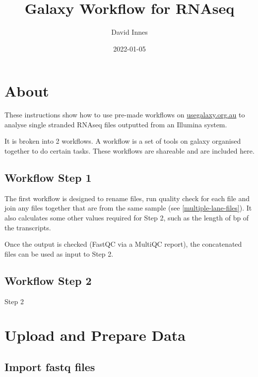 \documentclass[
]{book}
\title{Galaxy Workflow for RNAseq}
\author{David Innes}
\date{2022-01-05}
\begin{document}
\maketitle

{
\setcounter{tocdepth}{1}
\tableofcontents
}
\hypertarget{about}{%
\chapter{About}\label{about}}

These instructions show how to use pre-made workflows on \url{usegalaxy.org.au}
to analyse single stranded RNAseq files outputted from an Illumina system.

It is broken into 2 workflows. A workflow is a set of tools on galaxy organised together to do certain tasks. These workflows are shareable and are included here.

\hypertarget{workflow-step-1}{%
\section*{Workflow Step 1}\label{workflow-step-1}}

The first workflow is designed to rename files, run quality check for each file and join any files together that are from the same sample (see \ref{multiple-lane-files}). It also calculates some other values required for Step 2, such as the length of bp of the transcripts.

Once the output is checked (FastQC via a MultiQC report), the concatenated files can be used as input to Step 2.

\hypertarget{workflow-step-2}{%
\section*{Workflow Step 2}\label{workflow-step-2}}

Step 2

\hypertarget{upload-and-prepare-data}{%
\chapter{Upload and Prepare Data}\label{upload-and-prepare-data}}

\hypertarget{import-fastq-files}{%
\section{Import fastq files}\label{import-fastq-files}}
\end{document}
